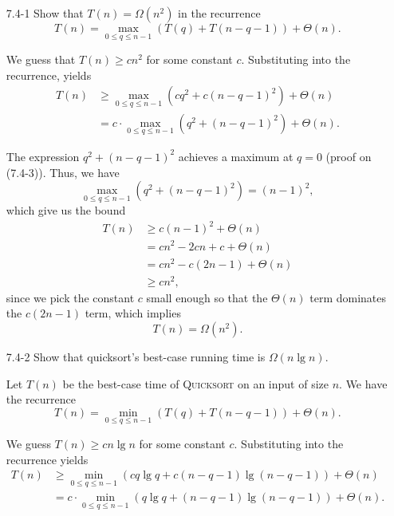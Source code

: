 \begin{enumerate}

\item[7.4{-}1]{Show that $T(n) = \Omega(n^2)$ in the recurrence
\[
  T(n) = \max_{0 \le q \le n - 1}(T(q) + T(n - q - 1)) + \Theta(n).
\]
}

\begin{framed}
We guess that $T(n) \ge cn^2$ for some constant $c$. Substituting into the
recurrence, yields
\begin{equation*}
\begin{aligned}
  T(n) &\ge \max_{0 \le q \le n - 1}(cq^2 + c(n - q - 1)^2) + \Theta(n)\\
       &=   c \cdot \max_{0 \le q \le n - 1}(q^2 + (n - q - 1)^2) + \Theta(n).
\end{aligned}
\end{equation*}

The expression $q^2 + (n - q - 1)^2$ achieves a maximum at $q = 0$ (proof on
(7.4-3)). Thus, we have
\[
  \max_{0 \le q \le n - 1}(q^2 + (n - q - 1)^2) = (n - 1)^2,
\]
which give us the bound
\begin{equation*}
\begin{aligned}
  T(n) &\ge c (n - 1)^2 + \Theta(n)\\
       &=   cn^2 - 2cn + c + \Theta(n)\\
       &=   cn^2 - c(2n - 1) + \Theta(n)\\
       &\ge cn^2,
\end{aligned}
\end{equation*}
since we pick the constant $c$ small enough so that the $\Theta(n)$ term
dominates the $c(2n - 1)$ term, which implies
\[
  T(n) = \Omega(n^2).
\]
\end{framed}

\item[7.4{-}2]{Show that quicksort's best-case running time is $\Omega(n \lg n)$.}

\begin{framed}
Let $T(n)$ be the best-case time of \textsc{Quicksort} on an input of size
$n$. We have the recurrence
\[
  T(n) = \min_{0 \le q \le n - 1}(T(q) + T(n - q - 1)) + \Theta(n).
\]

We guess $T(n) \ge cn \lg n$ for some constant $c$. Substituting into the
recurrence yields
\begin{equation*}
\begin{aligned}
  T(n) &\ge \min_{0 \le q \le n - 1}(cq \lg q + c(n - q - 1) \lg (n - q - 1)) + \Theta(n)\\
       &=   c \cdot \min_{0 \le q \le n - 1}(q \lg q + (n - q - 1) \lg (n - q - 1)) + \Theta(n).
\end{aligned}
\end{equation*}


\end{framed}
\end{enumerate}
